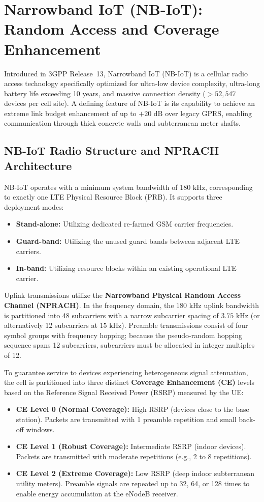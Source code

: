 \section{Narrowband IoT (NB-IoT): Random Access and Coverage Enhancement}
\label{sec:nbiot_ra}

Introduced in 3GPP Release~13, Narrowband IoT (NB-IoT) is a cellular radio access technology specifically optimized for ultra-low device complexity, ultra-long battery life exceeding 10 years, and massive connection density ($> 52{,}547$ devices per cell site). A defining feature of NB-IoT is its capability to achieve an extreme link budget enhancement of up to $+20\text{~dB}$ over legacy GPRS, enabling communication through thick concrete walls and subterranean meter shafts.

\subsection{NB-IoT Radio Structure and NPRACH Architecture}
NB-IoT operates with a minimum system bandwidth of $180\text{~kHz}$, corresponding to exactly one LTE Physical Resource Block (PRB). It supports three deployment modes:
\begin{itemize}
    \item \textbf{Stand-alone:} Utilizing dedicated re-farmed GSM carrier frequencies.
    \item \textbf{Guard-band:} Utilizing the unused guard bands between adjacent LTE carriers.
    \item \textbf{In-band:} Utilizing resource blocks within an existing operational LTE carrier.
\end{itemize}

Uplink transmissions utilize the \textbf{Narrowband Physical Random Access Channel (NPRACH)}. In the frequency domain, the $180\text{~kHz}$ uplink bandwidth is partitioned into 48 subcarriers with a narrow subcarrier spacing of $3.75\text{~kHz}$ (or alternatively 12 subcarriers at $15\text{~kHz}$). Preamble transmissions consist of four symbol groups with frequency hopping; because the pseudo-random hopping sequence spans 12 subcarriers, subcarriers must be allocated in integer multiples of 12.

To guarantee service to devices experiencing heterogeneous signal attenuation, the cell is partitioned into three distinct \textbf{Coverage Enhancement (CE)} levels based on the Reference Signal Received Power (RSRP) measured by the UE:
\begin{itemize}
    \item \textbf{CE Level 0 (Normal Coverage):} High RSRP (devices close to the base station). Packets are transmitted with 1 preamble repetition and small back-off windows.
    \item \textbf{CE Level 1 (Robust Coverage):} Intermediate RSRP (indoor devices). Packets are transmitted with moderate repetitions (e.g., 2 to 8 repetitions).
    \item \textbf{CE Level 2 (Extreme Coverage):} Low RSRP (deep indoor subterranean utility meters). Preamble signals are repeated up to 32, 64, or 128 times to enable energy accumulation at the eNodeB receiver.
\end{itemize}

